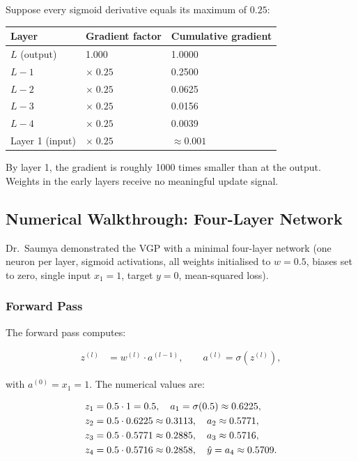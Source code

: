 \documentclass[12pt,a4paper]{article}
\newcommand{\sigmoid}{\sigma}
\begin{document}
\begin{example}[title=Layer-by-Layer Gradient Decay]
\label{ex:gradient_decay}
Suppose every sigmoid derivative equals its maximum of $0.25$:
\begin{center}
\begin{tabular}{@{}lll@{}}
\toprule
\textbf{Layer} & \textbf{Gradient factor} & \textbf{Cumulative gradient} \\
\midrule
$L$ (output)   & 1.000 & 1.0000 \\
$L-1$          & $\times\;0.25$ & 0.2500 \\
$L-2$          & $\times\;0.25$ & 0.0625 \\
$L-3$          & $\times\;0.25$ & 0.0156 \\
$L-4$          & $\times\;0.25$ & 0.0039 \\
Layer 1 (input)& $\times\;0.25$ & $\approx 0.001$ \\
\bottomrule
\end{tabular}
\end{center}
By layer 1, the gradient is roughly 1000 times smaller than at the
output.  Weights in the early layers receive no meaningful update
signal.
\end{example}

\subsection{Numerical Walkthrough: Four-Layer Network}
\label{subsec:four_layer}

Dr.\ Saumya demonstrated the VGP with a minimal four-layer network
(one neuron per layer, sigmoid activations, all weights initialised to
$w = 0.5$, biases set to zero, single input $x_1 = 1$, target $y = 0$,
mean-squared loss).

\subsubsection{Forward Pass}
\label{subsubsec:forward}

The forward pass computes:

\begin{align}
  z^{(l)} &= w^{(l)} \cdot a^{(l-1)}, \qquad a^{(l)} = \sigmoid(z^{(l)}),
  \label{eq:forward_pass}
\end{align}

with $a^{(0)} = x_1 = 1$.  The numerical values are:

\begin{align}
  z_1 &= 0.5 \cdot 1 = 0.5, \quad a_1 = \sigmoid(0.5) \approx 0.6225, \notag\\
  z_2 &= 0.5 \cdot 0.6225 \approx 0.3113, \quad a_2 \approx 0.5771, \notag\\
  z_3 &= 0.5 \cdot 0.5771 \approx 0.2885, \quad a_3 \approx 0.5716, \notag\\
  z_4 &= 0.5 \cdot 0.5716 \approx 0.2858, \quad
        \hat{y} = a_4 \approx 0.5709. \label{eq:forward_values}
\end{align}
\end{document}
